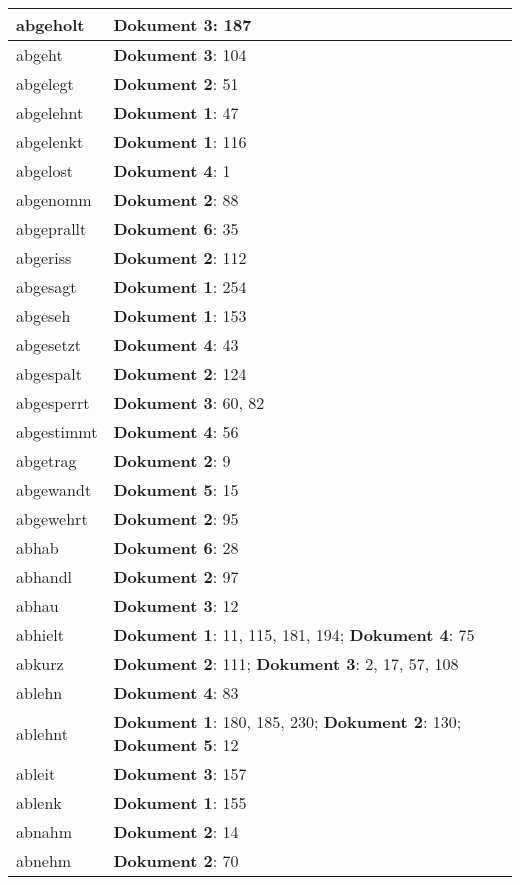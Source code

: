 \documentclass[a5paper]{article}
\begin{document}
\begin{longtable}[l]{|l|p{3in}|}
\hline
abgeholt & \textbf{Dokument 3}: 187 \\
\hline
abgeht & \textbf{Dokument 3}: 104 \\
\hline
abgelegt & \textbf{Dokument 2}: 51 \\
\hline
abgelehnt & \textbf{Dokument 1}: 47 \\
\hline
abgelenkt & \textbf{Dokument 1}: 116 \\
\hline
abgelost & \textbf{Dokument 4}: 1 \\
\hline
abgenomm & \textbf{Dokument 2}: 88 \\
\hline
abgeprallt & \textbf{Dokument 6}: 35 \\
\hline
abgeriss & \textbf{Dokument 2}: 112 \\
\hline
abgesagt & \textbf{Dokument 1}: 254 \\
\hline
abgeseh & \textbf{Dokument 1}: 153 \\
\hline
abgesetzt & \textbf{Dokument 4}: 43 \\
\hline
abgespalt & \textbf{Dokument 2}: 124 \\
\hline
abgesperrt & \textbf{Dokument 3}: 60, 82 \\
\hline
abgestimmt & \textbf{Dokument 4}: 56 \\
\hline
abgetrag & \textbf{Dokument 2}: 9 \\
\hline
abgewandt & \textbf{Dokument 5}: 15 \\
\hline
abgewehrt & \textbf{Dokument 2}: 95 \\
\hline
abhab & \textbf{Dokument 6}: 28 \\
\hline
abhandl & \textbf{Dokument 2}: 97 \\
\hline
abhau & \textbf{Dokument 3}: 12 \\
\hline
abhielt & \textbf{Dokument 1}: 11, 115, 181, 194; \textbf{Dokument 4}: 75 \\
\hline
abkurz & \textbf{Dokument 2}: 111; \textbf{Dokument 3}: 2, 17, 57, 108 \\
\hline
ablehn & \textbf{Dokument 4}: 83 \\
\hline
ablehnt & \textbf{Dokument 1}: 180, 185, 230; \textbf{Dokument 2}: 130; \textbf{Dokument 5}: 12 \\
\hline
ableit & \textbf{Dokument 3}: 157 \\
\hline
ablenk & \textbf{Dokument 1}: 155 \\
\hline
abnahm & \textbf{Dokument 2}: 14 \\
\hline
abnehm & \textbf{Dokument 2}: 70 \\

\end{longtable}
\end{document}
